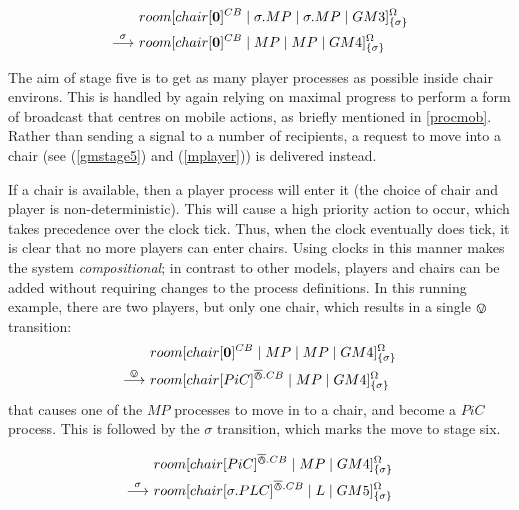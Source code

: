 \begin{equation}
\begin{aligned}
& {room}[ {chair}[ \textbf{0} ]^{CB} \;|\; 
   \sigma.MP \;|\; \sigma.MP \;|\;
   GM3 ]^{\Omega}_{\{\sigma\}} \\
\stackrel{\sigma}{\longrightarrow}\ & {room}[ {chair}[ \textbf{0} ]^{CB} \;|\; 
   MP \;|\; MP \;|\;
   GM4 ]^{\Omega}_{\{\sigma\}} \\
\end{aligned}
\end{equation}

The aim of stage five is to get as many player processes as possible
inside chair environs.  This is handled by again relying on maximal
progress to perform a form of broadcast that centres on mobile
actions, as briefly mentioned in \ref{procmob}.  Rather than sending a
signal to a number of recipients, a request to move into a chair (see
(\ref{gmstage5}) and (\ref{mplayer})) is delivered instead.

If a chair is available, then a player process will enter it (the
choice of chair and player is non-deterministic).  This will cause a
high priority action to occur, which takes precedence over the clock
tick.  Thus, when the clock eventually does tick, it is clear that no
more players can enter chairs. Using clocks in this manner makes the
system \emph{compositional}; in contrast to other models, players and
chairs can be added without requiring changes to the process
definitions.  In this running example, there are two players, but only
one chair, which results in a single $\varovee$ transition:
\begin{equation}
\begin{aligned}
& {room}[ {chair}[ \textbf{0} ]^{CB} \;|\; 
   MP \;|\; MP \;|\;
   GM4 ]^{\Omega}_{\{\sigma\}} \\
\stackrel{\varovee}{\longrightarrow}\ & {room}[ {chair}[ PiC ]^{\overline{\varowedge}.CB} \;|\; 
   MP \;|\;
   GM4 ]^{\Omega}_{\{\sigma\}} \\
\end{aligned}
\end{equation}
that causes one of the $MP$ processes to move in to a
chair, and become a $PiC$ process.  This is followed by the
$\sigma$ transition, which marks the move to stage six.

\begin{equation}
\begin{aligned}
&  {room}[ {chair}[ PiC ]^{\overline{\varowedge}.CB} \;|\; 
   MP \;|\;
   GM4 ]^{\Omega}_{\{\sigma\}} \\
\stackrel{\sigma}{\longrightarrow}\ & {room}[ {chair}[ \sigma.PLC ]^{\overline{\varowedge}.CB} \;|\; 
   L \;|\;
   GM5 ]^{\Omega}_{\{\sigma\}} \\
\end{aligned}
\end{equation}

